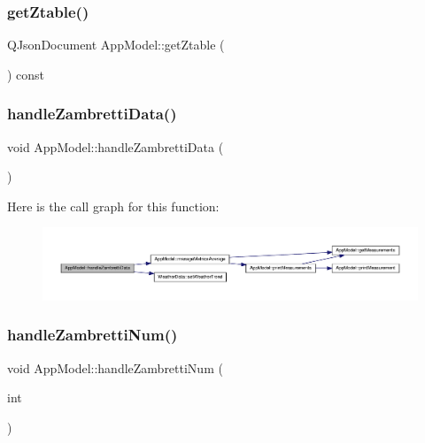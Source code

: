 \subsubsection{\texorpdfstring{get\+Ztable()}{getZtable()}}
{\footnotesize\ttfamily Q\+Json\+Document App\+Model\+::get\+Ztable (\begin{DoxyParamCaption}{ }\end{DoxyParamCaption}) const}

\mbox{\label{class_app_model_a99a784aac19e82ccc6c0dd0509b4ea04}} 
\subsubsection{\texorpdfstring{handle\+Zambretti\+Data()}{handleZambrettiData()}}
{\footnotesize\ttfamily void App\+Model\+::handle\+Zambretti\+Data (\begin{DoxyParamCaption}{ }\end{DoxyParamCaption})}

Here is the call graph for this function\+:\nopagebreak
\begin{figure}[H]
\begin{center}
\leavevmode
\includegraphics[width=350pt]{class_app_model_a99a784aac19e82ccc6c0dd0509b4ea04_cgraph}
\end{center}
\end{figure}
\mbox{\label{class_app_model_a75d2b6e818885a77f1b1dd56fc3c9cd3}} 
\subsubsection{\texorpdfstring{handle\+Zambretti\+Num()}{handleZambrettiNum()}}
{\footnotesize\ttfamily void App\+Model\+::handle\+Zambretti\+Num (\begin{DoxyParamCaption}\item[{int}]{ }\end{DoxyParamCaption})}


